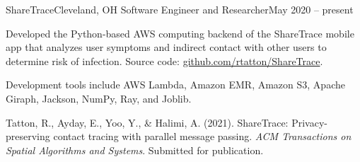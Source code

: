 \begin{ritemize}
{ShareTrace}{Cleveland, OH}
{Software Engineer and Researcher}{May 2020 -- present}
	\item Developed the Python-based AWS computing backend of the ShareTrace mobile app that analyzes user symptoms and indirect contact with other users to determine risk of infection. Source code: \url{github.com/rtatton/ShareTrace}.
	\item Development tools include AWS Lambda, Amazon EMR, Amazon S3, Apache Giraph, Jackson, NumPy, Ray, and Joblib.
	\item Tatton, R., Ayday, E., Yoo, Y., \& Halimi, A. (2021). ShareTrace: Privacy-preserving contact tracing with parallel message passing. \textit{ACM Transactions on Spatial Algorithms and Systems}. Submitted for publication.
\end{ritemize}
